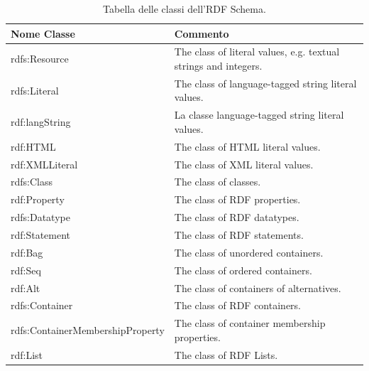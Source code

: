 \documentclass[a4paper,11pt]{article}
\begin{document}
\begin{enumerate}
\begin{enumerate}[label*=\arabic*.]
		\begin{table}[htb]
		\begin{center}				
		\begin{tabular}{|>{\small}l|>{\small}l|}
				\hline
				\textbf{Nome Classe} & \textbf{Commento}\\				
				\hline
				rdfs:Resource & The class of literal values, e.g. textual strings and integers.\\
				\hline
rdfs:Literal & 	The class of language-tagged string literal values.\\
				\hline
rdf:langString & La classe  language-tagged string literal values.\\
				\hline
rdf:HTML &	The class of HTML literal values.\\
				\hline
rdf:XMLLiteral	& The class of XML literal values.\\
				\hline
rdfs:Class & The class of classes.\\
				\hline
rdf:Property & The class of RDF properties.\\
				\hline
rdfs:Datatype &	The class of RDF datatypes.\\
				\hline
rdf:Statement & The class of RDF statements.\\
				\hline
rdf:Bag	& The class of unordered containers.\\
				\hline
rdf:Seq	& The class of ordered containers.\\
				\hline
rdf:Alt	& The class of containers of alternatives.\\
				\hline
rdfs:Container & The class of RDF containers.\\
				\hline
rdfs:ContainerMembershipProperty & The class of container membership properties.\\
				\hline
rdf:List &	The class of RDF Lists.\\
				\hline
			
		\end{tabular}	
		\caption{Tabella delle classi dell'RDF Schema.}	
		\end{center}	
		\end{table}
		

\end{enumerate}
\end{enumerate}
\end{document}

